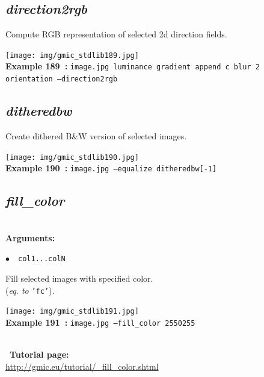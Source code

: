\documentclass[a4paper,10.5pt,twoside]{book}
\def\comma{\discretionary{,}{}{,}}
\newcommand{\Cb}[1]{\textcolor{cb}{#1}}
\begin{document}
\subsection{\emph{direction2rgb} }\vspace*{-0.7em}
Compute RGB representation of selected 2d direction fields.
\begin{center}\texttt{[image: img/gmic\_stdlib189.jpg]}\\
{\footnotesize \textbf{Example 189~:} \texttt{image.jpg luminance gradient append c blur 2 orientation --direction2rgb}}
\end{center}

\subsection{\emph{ditheredbw} }\vspace*{-0.7em}
Create dithered B\&W version of selected images.
\begin{center}\texttt{[image: img/gmic\_stdlib190.jpg]}\\
{\footnotesize \textbf{Example 190~:} \texttt{image.jpg --equalize ditheredbw[-1]}}
\end{center}

\subsection{\emph{fill\_color} }\vspace*{-0.7em}
~\\\textbf{\Cb{Arguments: }}\begin{flushleft}
{\small \Cb{\hspace*{0.5cm}$\bullet$~~\texttt{col1{\comma}...{\comma}colN}}}\end{flushleft}
Fill selected images with specified color.
~\\(\emph{eq. to} {\small \texttt{'fc'}}).
\begin{center}\texttt{[image: img/gmic\_stdlib191.jpg]}\\
{\footnotesize \textbf{Example 191~:} \texttt{image.jpg --fill\_color 255{\comma}0{\comma}255}}
\end{center}
~\\
~\textbf{Tutorial page: }\\\url{http://gmic.eu/tutorial/\_fill\_color.shtml}
\end{document}
